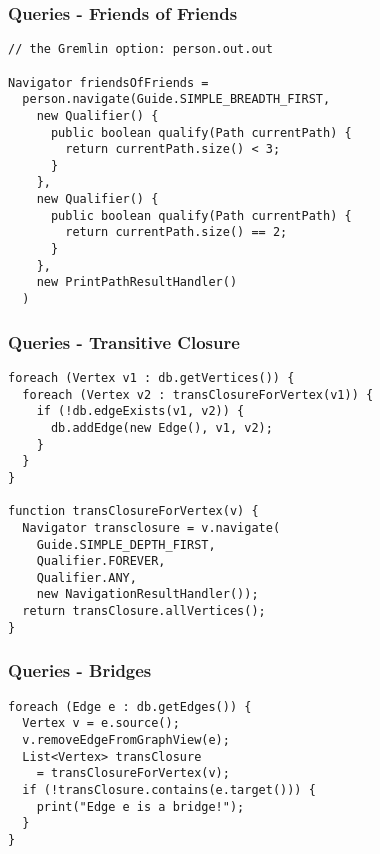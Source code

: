 
\begin{frame}[fragile]
\frametitle{Queries - Friends of Friends}

\begin{lstlisting}
// the Gremlin option: person.out.out

Navigator friendsOfFriends = 
  person.navigate(Guide.SIMPLE_BREADTH_FIRST,
    new Qualifier() {
      public boolean qualify(Path currentPath) {
        return currentPath.size() < 3;
      }
    },
    new Qualifier() {
      public boolean qualify(Path currentPath) {
        return currentPath.size() == 2;
      }
    },
    new PrintPathResultHandler()
  )
\end{lstlisting}
\end{frame}



\begin{frame}[fragile]
\frametitle{Queries - Transitive Closure}

\begin{lstlisting}
foreach (Vertex v1 : db.getVertices()) {
  foreach (Vertex v2 : transClosureForVertex(v1)) {  
    if (!db.edgeExists(v1, v2)) {
      db.addEdge(new Edge(), v1, v2);
    }
  }
}

function transClosureForVertex(v) {
  Navigator transclosure = v.navigate(
    Guide.SIMPLE_DEPTH_FIRST, 
    Qualifier.FOREVER,
    Qualifier.ANY,
    new NavigationResultHandler());
  return transClosure.allVertices();
}
\end{lstlisting}
\end{frame}



\begin{frame}[fragile]
\frametitle{Queries - Bridges}

\begin{lstlisting}
foreach (Edge e : db.getEdges()) {
  Vertex v = e.source();
  v.removeEdgeFromGraphView(e);
  List<Vertex> transClosure
    = transClosureForVertex(v);
  if (!transClosure.contains(e.target())) {
    print("Edge e is a bridge!");
  }
}
\end{lstlisting}
\end{frame}
